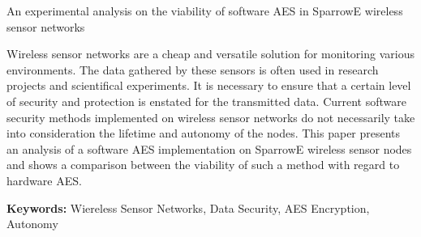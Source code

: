 An experimental analysis on the viability of software AES in SparrowE wireless sensor networks

Wireless sensor networks are a cheap and versatile solution for monitoring various environments.
The data gathered by these sensors is often used in research projects and scientifical experiments.
It is necessary to ensure that a certain level of security and protection is enstated for the transmitted 
data. Current software security methods implemented on wireless sensor networks do not necessarily take 
into consideration the lifetime and autonomy of the nodes. This paper presents an analysis of a software 
AES implementation on SparrowE wireless sensor nodes and shows a comparison between the viability of such a 
method with regard to hardware AES.

\textbf{Keywords:} Wiereless Sensor Networks, Data Security, AES Encryption, Autonomy
